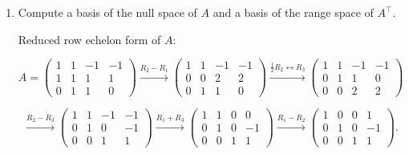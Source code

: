\documentclass{article}
\begin{document}
\begin{enumerate}
    \item Compute a basis of the null space of $A$ and a basis of the range space of $A^\top$.
    
    \bigskip
    Reduced row echelon form of $A$:

    \begin{equation*}
        A = \left(
            \begin{array}{rrrr}
                1 & 1 & -1 & -1 \\
                1 & 1 & 1 & 1 \\
                0 & 1 & 1 & 0 
            \end{array}
        \right)
        \overset{R_2-R_1}{\longrightarrow}
        \left(
            \begin{array}{rrrr}
                1 & 1 & -1 & -1 \\
                0 & 0 & 2 & 2 \\
                0 & 1 & 1 & 0 
            \end{array}
        \right)
        \overset{\frac{1}{2} R_2 \leftrightarrow R_3}{\longrightarrow}
        \left(
            \begin{array}{rrrr}
                1 & 1 & -1 & -1 \\
                0 & 1 & 1 & 0 \\
                0 & 0 & 2 & 2 
            \end{array}
        \right)
    \end{equation*}
    
    \begin{equation*}
        \overset{R_2-R_3}{\longrightarrow}
        \left(
            \begin{array}{rrrr}
                1 & 1 & -1 & -1 \\
                0 & 1 & 0 & -1 \\
                0 & 0 & 1 & 1 
            \end{array}
        \right)
        \overset{R_1+R_3}{\longrightarrow}
        \left(
            \begin{array}{rrrr}
                1 & 1 & 0 & 0 \\
                0 & 1 & 0 & -1 \\
                0 & 0 & 1 & 1 
            \end{array}
        \right)
        \overset{R_1-R_2}{\longrightarrow}
        \left(
            \begin{array}{rrrr}
                1 & 0 & 0 & 1 \\
                0 & 1 & 0 & -1 \\
                0 & 0 & 1 & 1 
            \end{array}
        \right).
    \end{equation*}
    

\end{enumerate}
\end{document}
